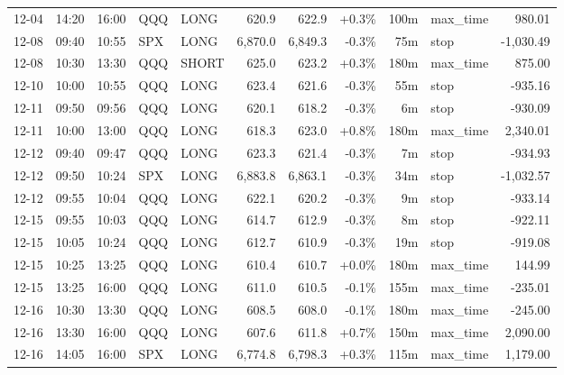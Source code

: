 \documentclass[11pt,a4paper,twoside]{article}
\begin{document}
\begin{center}
\begin{longtable}{>{\color{txtmain}}l l l l l r r r r >{\color{txtmain}}l r}
12-04 & 14:20 & 16:00 & QQQ & LONG & 620.9 & 622.9 & \textcolor{wingreen}{+0.3\%} & 100m & max\_time & \textcolor{wingreen}{980.01} \\
12-08 & 09:40 & 10:55 & SPX & LONG & 6,870.0 & 6,849.3 & \textcolor{lossred}{-0.3\%} & 75m & stop & \textcolor{lossred}{-1,030.49} \\
12-08 & 10:30 & 13:30 & QQQ & SHORT & 625.0 & 623.2 & \textcolor{wingreen}{+0.3\%} & 180m & max\_time & \textcolor{wingreen}{875.00} \\
12-10 & 10:00 & 10:55 & QQQ & LONG & 623.4 & 621.6 & \textcolor{lossred}{-0.3\%} & 55m & stop & \textcolor{lossred}{-935.16} \\
12-11 & 09:50 & 09:56 & QQQ & LONG & 620.1 & 618.2 & \textcolor{lossred}{-0.3\%} & 6m & stop & \textcolor{lossred}{-930.09} \\
12-11 & 10:00 & 13:00 & QQQ & LONG & 618.3 & 623.0 & \textcolor{wingreen}{+0.8\%} & 180m & max\_time & \textcolor{wingreen}{2,340.01} \\
12-12 & 09:40 & 09:47 & QQQ & LONG & 623.3 & 621.4 & \textcolor{lossred}{-0.3\%} & 7m & stop & \textcolor{lossred}{-934.93} \\
12-12 & 09:50 & 10:24 & SPX & LONG & 6,883.8 & 6,863.1 & \textcolor{lossred}{-0.3\%} & 34m & stop & \textcolor{lossred}{-1,032.57} \\
12-12 & 09:55 & 10:04 & QQQ & LONG & 622.1 & 620.2 & \textcolor{lossred}{-0.3\%} & 9m & stop & \textcolor{lossred}{-933.14} \\
12-15 & 09:55 & 10:03 & QQQ & LONG & 614.7 & 612.9 & \textcolor{lossred}{-0.3\%} & 8m & stop & \textcolor{lossred}{-922.11} \\
12-15 & 10:05 & 10:24 & QQQ & LONG & 612.7 & 610.9 & \textcolor{lossred}{-0.3\%} & 19m & stop & \textcolor{lossred}{-919.08} \\
12-15 & 10:25 & 13:25 & QQQ & LONG & 610.4 & 610.7 & \textcolor{wingreen}{+0.0\%} & 180m & max\_time & \textcolor{wingreen}{144.99} \\
12-15 & 13:25 & 16:00 & QQQ & LONG & 611.0 & 610.5 & \textcolor{lossred}{-0.1\%} & 155m & max\_time & \textcolor{lossred}{-235.01} \\
12-16 & 10:30 & 13:30 & QQQ & LONG & 608.5 & 608.0 & \textcolor{lossred}{-0.1\%} & 180m & max\_time & \textcolor{lossred}{-245.00} \\
12-16 & 13:30 & 16:00 & QQQ & LONG & 607.6 & 611.8 & \textcolor{wingreen}{+0.7\%} & 150m & max\_time & \textcolor{wingreen}{2,090.00} \\
12-16 & 14:05 & 16:00 & SPX & LONG & 6,774.8 & 6,798.3 & \textcolor{wingreen}{+0.3\%} & 115m & max\_time & \textcolor{wingreen}{1,179.00} \\

\end{longtable}
\end{center}
\end{document}
